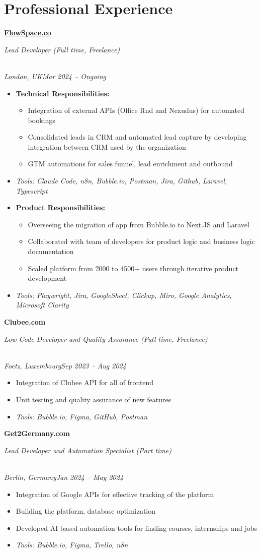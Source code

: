 \documentclass[a4paper,10pt]{article}
\newcommand{\role}[4]{\vspace{3pt}\noindent\hspace{0.6em}\parbox[t]{0.38\textwidth}{\raggedright\textbf{#1}}\hfill\parbox[t]{0.58\textwidth}{\raggedleft\textit{#2}}\\{\textit{#3}\hfill\textit{#4}}\vspace{1pt}}
\begin{document}
\section{Professional Experience}
\role{\href{https://flowspace.co}{FlowSpace.co}}{Lead Developer (Full time, Freelance)}{London, UK}{Mar 2024 -- Ongoing}
\begin{itemize}
\item \textbf{Technical Responsibilities:}
\begin{itemize}[label=--]
\item Integration of external APIs (Office Rnd and Nexudus) for automated bookings
\item Consolidated leads in CRM and automated lead capture by developing integration between CRM used by the organization
\item GTM automations for sales funnel, lead enrichment and outbound
\end{itemize}
\item \textit{Tools: Claude Code, n8n, Bubble.io, Postman, Jira, Github, Laravel, Typescript}
\item \textbf{Product Responsibilities:}
\begin{itemize}[label=--]
\item Overseeing the migration of app from Bubble.io to Next.JS and Laravel
\item Collaborated with team of developers for product logic and business logic documentation
\item Scaled platform from 2000 to 4500+ users through iterative product development
\end{itemize}
\item \textit{Tools: Playwright, Jira, GoogleSheet, Clickup, Miro, Google Analytics, Microsoft Clarity}
\end{itemize}

\role{Clubee.com}{Low Code Developer and Quality Assurance (Full time, Freelance)}{Foetz, Luxembourg}{Sep 2023 -- Aug 2024}
\begin{itemize}
\item Integration of Clubee API for all of frontend
\item Unit testing and quality assurance of new features
\item \textit{Tools: Bubble.io, Figma, GitHub, Postman}
\end{itemize}

\role{Get2Germany.com}{Lead Developer and Automation Specialist (Part time)}{Berlin, Germany}{Jan 2024 -- May 2024}
\begin{itemize}
\item Integration of Google APIs for effective tracking of the platform
\item Building the platform, database optimization
\item Developed AI based automation tools for finding courses, internships and jobs
\item \textit{Tools: Bubble.io, Figma, Trello, n8n}
\end{itemize}
\end{document}

